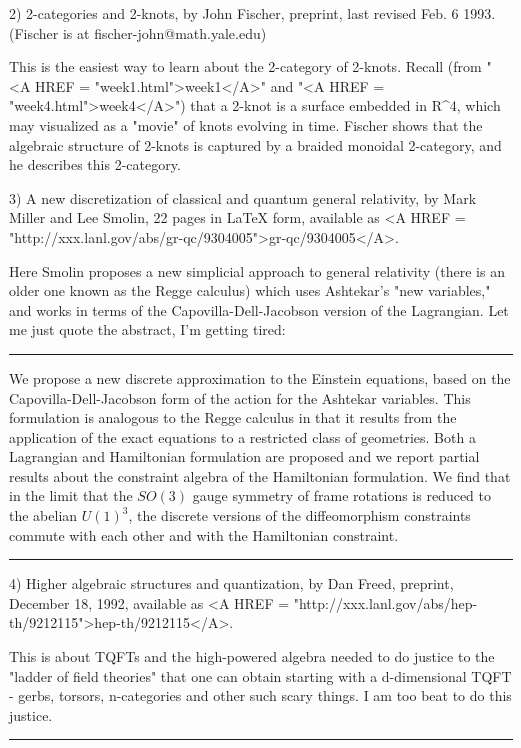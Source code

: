 2) 2-categories and 2-knots, by John Fischer, preprint, last revised Feb.
6 1993.  (Fischer is at fischer-john@math.yale.edu)

This is the easiest way to learn about the 2-category of 2-knots.  
Recall (from "<A HREF = "week1.html">week1</A>" and "<A HREF = "week4.html">week4</A>") that a 2-knot is a surface embedded in
R^4, which may visualized as a "movie" of knots evolving in time.  
Fischer shows that the algebraic structure of 2-knots is captured by
a braided monoidal 2-category, and he describes this 2-category.

3) A new discretization of classical and quantum general relativity, by
Mark Miller and Lee Smolin, 22 pages in LaTeX form, available as 
<A HREF = "http://xxx.lanl.gov/abs/gr-qc/9304005">gr-qc/9304005</A>.

Here Smolin proposes a new simplicial approach to general relativity
(there is an older one known as the Regge calculus) which uses
Ashtekar's "new variables," and works in terms of the
Capovilla-Dell-Jacobson version of the Lagrangian.
Let me just quote the abstract, I'm getting tired:

\par\noindent\rule{\textwidth}{0.4pt}
We propose a new discrete approximation to the Einstein equations,
based on the Capovilla-Dell-Jacobson form of the action for the
Ashtekar variables.  This formulation is analogous to the Regge
calculus in that it results from the application of the exact
equations to a restricted class of geometries.  Both a Lagrangian
and Hamiltonian formulation are proposed and we report partial
results about the constraint algebra of the Hamiltonian formulation.
We find that in the limit that the $SO(3)$ gauge symmetry of frame
rotations is reduced to the abelian $U(1)^3$, the discrete versions
of the  diffeomorphism constraints commute with each other and with
the Hamiltonian constraint.
\par\noindent\rule{\textwidth}{0.4pt}

4)  Higher algebraic structures and quantization, by Dan Freed,
preprint, December 18, 1992, available as <A HREF = "http://xxx.lanl.gov/abs/hep-th/9212115">hep-th/9212115</A>.  

This is about TQFTs and the high-powered algebra needed to do justice to
the "ladder of field theories" that one can obtain starting with a
d-dimensional TQFT - gerbs, torsors, n-categories and other such scary
things.  I am too beat to do this justice.  
\par\noindent\rule{\textwidth}{0.4pt}

